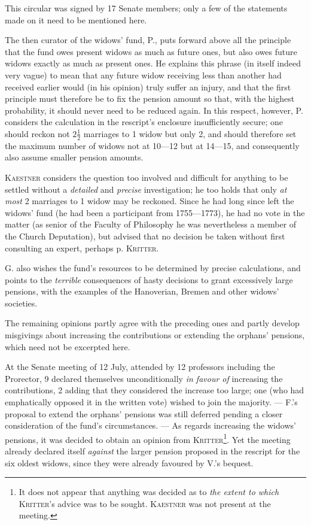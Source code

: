 This circular was signed by 17 Senate members; only a few of the statements made on it need to be mentioned here.

The then curator of the widows' fund, P., puts forward above all the principle that the fund owes present widows as much as future ones, but also owes future widows exactly as much as present ones. He explains this phrase (in itself indeed very vague) to mean that any future widow receiving less than another had received earlier would (in his opinion) truly suffer an injury, and that the first principle must therefore be to fix the pension amount so that, with the highest probability, it should never need to be reduced again. In this respect, however, P. considers the calculation in the rescript's enclosure insufficiently secure; one should reckon not \(2\tfrac12\) marriages to 1 widow but only 2, and should therefore set the maximum number of widows not at 10—12 but at 14—15, and consequently also assume smaller pension amounts.

\textsc{Kaestner} considers the question too involved and difficult for anything to be settled without a \textit{detailed} and \textit{precise} investigation; he too holds that only \textit{at most} 2 marriages to 1 widow may be reckoned. Since he had long since left the widows' fund (he had been a participant from 1755—1773), he had no vote in the matter (as senior of the Faculty of Philosophy he was nevertheless a member of the Church Deputation), but advised that no decision be taken without first consulting an expert, perhaps p. \textsc{Kritter}.

G. also wishes the fund's resources to be determined by precise calculations, and points to the \textit{terrible} consequences of hasty decisions to grant excessively large pensions, with the examples of the Hanoverian, Bremen and other widows' societies.

The remaining opinions partly agree with the preceding ones and partly develop misgivings about increasing the contributions or extending the orphans' pensions, which need not be excerpted here.

At the Senate meeting of 12 July, attended by 12 professors including the Prorector, 9 declared themselves unconditionally \textit{in favour of} increasing the contributions, 2 adding that they considered the increase too large; one (who had emphatically opposed it in the written vote) wished to join the majority. — F.'s proposal to extend the orphans' pensions was still deferred pending a closer consideration of the fund's circumstances. — As regards
increasing the widows' pensions, it was decided to obtain an opinion from \textsc{Kritter}\footnote{It does not appear that anything was decided as to \textit{the extent to which} \textsc{Kritter}'s advice was to be sought. \textsc{Kaestner} was not present at the meeting.}. Yet the meeting already declared itself \textit{against} the larger pension proposed in the rescript for the six oldest widows, since they were already favoured by V.'s bequest.


